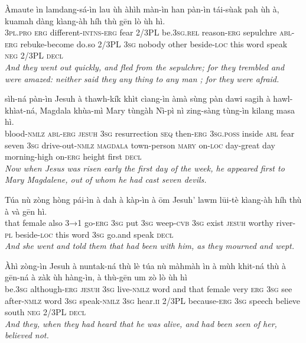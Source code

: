 \documentclass[11pt,a4paper]{article}
\begin{document}
\begin{exe}
\gll Àmaute ìn lamdang-sá-ìn lau ùh àhìh màn-ìn han pàn-ìn tái-sùak pah ùh à, kuamah dàng kìang-àh híh thù gēn lò ùh hì. \\
     \textsc{3pl}.\textsc{pro} \textsc{erg} different-\textsc{intns}-\textsc{erg} fear 2/3PL be.\textsc{3sg}.\textsc{rel} reason-\textsc{erg} sepulchre \textsc{abl}-\textsc{erg} rebuke-become do.so 2/3PL \textsc{3sg} nobody other beside-\textsc{loc} this word speak \textsc{neg} 2/3PL \textsc{decl} \\
\glt \textcolor{kjvcolor}{\textit{And they went out quickly, and fled from the sepulchre; for they trembled and were amazed: neither said they any thing to any man ; for they were afraid.}}

\gll sìh-ná pàn-ìn Jesuh à thawh-kík khìt cìang-ìn àmà sùng pàn dawi sagih à hawl-khìat-ná, Magdala khùa-mì Mary tùngàh Nì-pì nì zing-sàng tùng-ìn kilang masa hì. \\
     blood-\textsc{nmlz} \textsc{abl}-\textsc{erg} \textsc{jesuh} \textsc{3sg} resurrection \textsc{seq} then-\textsc{erg} \textsc{3sg}.\textsc{poss} inside \textsc{abl} fear seven \textsc{3sg} drive-out-\textsc{nmlz} \textsc{magdala} town-person \textsc{mary} on-\textsc{loc} day-great day morning-high on-\textsc{erg} height first \textsc{decl} \\
\glt \textcolor{kjvcolor}{\textit{Now when Jesus was risen early the first day of the week, he appeared first to Mary Magdalene, out of whom he had cast seven devils.}}

\gll Túa nù zòng hòng pái-ìn à dah à kàp-ìn à ōm Jesuh' lawm lūi-tè kìang-àh híh thù à và gēn hì. \\
     that female also \textsc{3→1} go-\textsc{erg} \textsc{3sg} put \textsc{3sg} weep-\textsc{cvb} \textsc{3sg} exist \textsc{jesuh} worthy river-\textsc{pl} beside-\textsc{loc} this word \textsc{3sg} go.and speak \textsc{decl} \\
\glt \textcolor{kjvcolor}{\textit{And she went and told them that had been with him, as they mourned and wept.}}

\gll Àhì zòng-ìn Jesuh à nuntak-ná thù lè túa nù màhmàh ìn à mùh khit-ná thù à gēn-ná à zàk ùh hàng-ìn, à thù-gēn um zò lò ùh hì \\
     be.\textsc{3sg} although-\textsc{erg} \textsc{jesuh} \textsc{3sg} live-\textsc{nmlz} word and that female very \textsc{erg} \textsc{3sg} see after-\textsc{nmlz} word \textsc{3sg} speak-\textsc{nmlz} \textsc{3sg} hear.\textsc{ii} 2/3PL because-\textsc{erg} \textsc{3sg} speech believe south \textsc{neg} 2/3PL \textsc{decl} \\
\glt \textcolor{kjvcolor}{\textit{And they, when they had heard that he was alive, and had been seen of her, believed not.}}


\end{exe}
\end{document}
